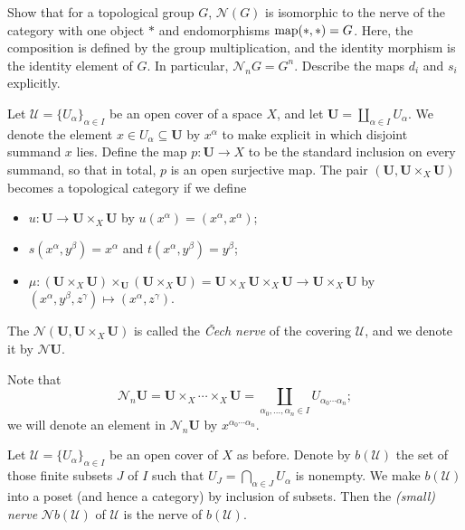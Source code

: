 \documentclass[a4paper,openany]{scrbook}
\newcommand{\nerve}{\mathcal N}
\begin{document}
\begin{exer}
Show that for a topological group $G$, $\nerve(G)$ is isomorphic to the nerve of the category with one object $*$ and endomorphisms $\operatorname{map}(*,*)=G$. Here, the composition is defined by the group multiplication, and the identity morphism is the identity element of $G$. In particular, $\nerve_nG = G^n$. Describe the maps $d_i$ and $s_i$ explicitly.
\end{exer}

\begin{example}
Let $\mathcal U = \{U_\alpha\}_{\alpha \in I}$ be an open cover of a space $X$, and let $\mathbf U = \coprod_{\alpha \in I} U_\alpha$. We denote the element $x \in U_\alpha \subseteq \mathbf U$ by $x^{\alpha}$ to make explicit in which disjoint summand $x$ lies. Define the map $p\colon \mathbf U \to X$ to be the standard inclusion on every summand, so that in total, $p$ is an open surjective map.
The pair $(\mathbf U,\mathbf U \times_X \mathbf U)$ becomes a topological category if we define
\begin{itemize}
\item $u\colon \mathbf U \to \mathbf U \times_X \mathbf U$ by $u(x^\alpha) = (x^\alpha,x^\alpha)$;
\item $s(x^\alpha,y^\beta) = x^\alpha$ and $t(x^\alpha,y^\beta) = y^\beta$;
\item $\mu\colon (\mathbf U \times_X \mathbf U) \times_{\mathbf U} (\mathbf U \times_X \mathbf U) = \mathbf U \times_X \mathbf U \times_X \mathbf U \to \mathbf U \times_X \mathbf U$ by $(x^\alpha,y^\beta,z^\gamma) \mapsto (x^\alpha,z^\gamma)$.
\end{itemize}
The $\nerve(\mathbf U,\mathbf U \times_X \mathbf U)$ is called the \emph{\v Cech nerve} of the covering $\mathcal U$, and we denote it by $\nerve\mathbf U$.
\end{example}

Note that
\[
\nerve_n\mathbf U = \mathbf U \times_X \cdots \times_X \mathbf U = \coprod_{\alpha_0,\dots,\alpha_n \in I} U_{\alpha_0\cdots\alpha_n};
\]
we will denote an element in $\nerve_n\mathbf U$ by $x^{\alpha_0\cdots\alpha_n}$.

\begin{example}
Let $\mathcal U = \{U_\alpha\}_{\alpha \in I}$ be an open cover of $X$ as before. Denote by $b(\mathcal U)$ the set of those finite subsets $J$ of $I$ such that $U_J = \bigcap_{\alpha \in J} U_\alpha$ is nonempty. We make $b(\mathcal U)$ into a poset (and hence a category) by inclusion of subsets. Then the \emph{(small) nerve} $\nerve b(\mathcal U)$ of $\mathcal U$ is the nerve of $b(\mathcal U)$.
\end{example}
\end{document}
